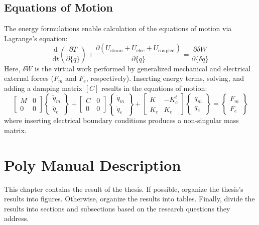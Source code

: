 \documentclass[thesis]{fputhesis}
\begin{document}
\begin{body}
\subsection{Equations of Motion}
The energy formulations enable calculation of the equations of motion via Lagrange's equation:
\begin{equation}
\frac{\text{d}}{\text{d}t}\left(\frac{\partial T}{\partial \{\dot{q}\}}\right)+\frac{\partial(U_{\text{strain}}+U_{\text{elec}}+U_{\text{coupled}})}{\partial \{q\}}=\frac{\partial \delta W}{\partial \{ \delta q \}}
\end{equation}
Here, $\delta W$ is the virtual work performed by generalized mechanical and electrical external forces ($F_m$ and $F_e$, respectively). Inserting energy terms, solving, and adding a damping matrix $[C]$ results in the equations of motion:
\begin{equation}
\begin{bmatrix} M & 0 \\ 0 & 0 \end{bmatrix}
\begin{Bmatrix} \ddot{q}_m \\ \ddot{q}_e \end{Bmatrix}
+\begin{bmatrix} C & 0 \\ 0 & 0 \end{bmatrix}
\begin{Bmatrix} \dot{q}_m \\ \dot{q}_e \end{Bmatrix}
+\begin{bmatrix} K & -K_c^t \\ K_c & K_e \end{bmatrix}
\begin{Bmatrix} {q}_m \\ {q}_e \end{Bmatrix}
=\begin{Bmatrix} F_m \\ F_e \end{Bmatrix}
\end{equation}
where inserting electrical boundary conditions produces a non-singular mass matrix.






\section{Poly Manual Description}
This chapter contains the result of the thesis. If possible, organize the thesis’s results into figures. Otherwise, organize the results into tables. Finally, divide the results into sections and subsections based on the research questions they address.






\end{body}
\end{document}
